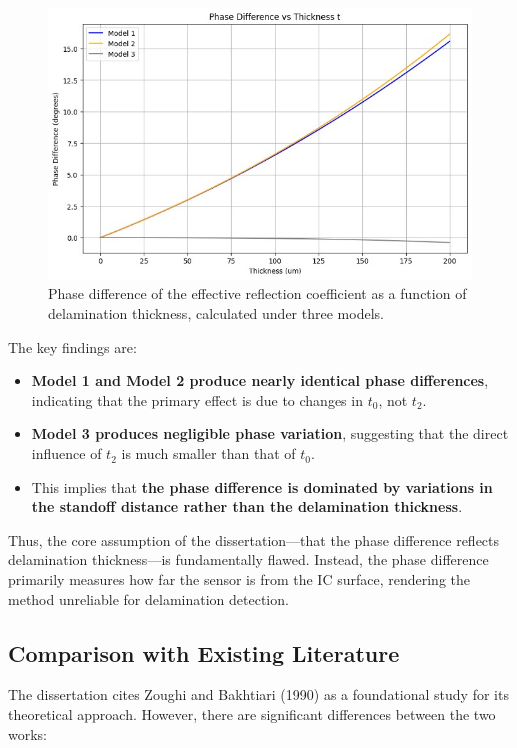\documentclass[10pt,twocolumn]{article}
\begin{document}
\begin{figure}[ht]
    \centering
    \includegraphics[width=0.8\linewidth]{Fig2.jpg}
    \caption{Phase difference of the effective reflection coefficient as a function of delamination thickness, calculated under three models.}
    \label{fig:phase_difference}
\end{figure}

The key findings are:

\begin{itemize}
    \item \textbf{Model 1 and Model 2 produce nearly identical phase differences}, indicating that the primary effect is due to changes in \( t_0 \), not \( t_2 \).
    \item \textbf{Model 3 produces negligible phase variation}, suggesting that the direct influence of \( t_2 \) is much smaller than that of \( t_0 \).
    \item This implies that \textbf{the phase difference is dominated by variations in the standoff distance rather than the delamination thickness}.
\end{itemize}

Thus, the core assumption of the dissertation—that the phase difference reflects delamination thickness—is fundamentally flawed. Instead, the phase difference primarily measures how far the sensor is from the IC surface, rendering the method unreliable for delamination detection.

\subsection{Comparison with Existing Literature}

The dissertation cites Zoughi and Bakhtiari (1990) \cite{2} as a foundational study for its theoretical approach. However, there are significant differences between the two works:
\end{document}
